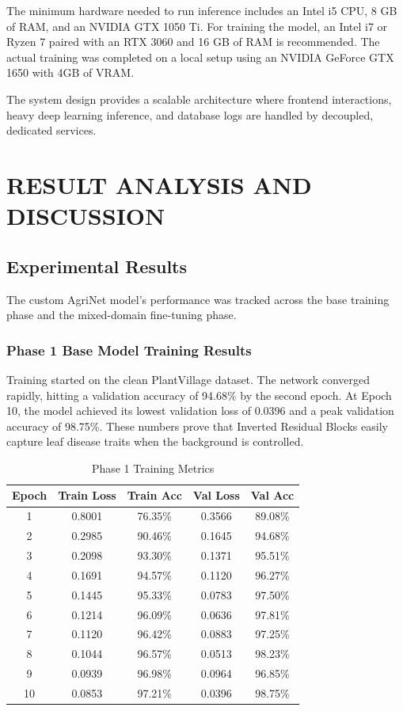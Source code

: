 \documentclass[12pt, a4paper]{report}
\begin{document}
The minimum hardware needed to run inference includes an Intel i5 CPU, 8 GB of RAM, and an NVIDIA GTX 1050 Ti. For training the model, an Intel i7 or Ryzen 7 paired with an RTX 3060 and 16 GB of RAM is recommended. The actual training was completed on a local setup using an NVIDIA GeForce GTX 1650 with 4GB of VRAM.

The system design provides a scalable architecture where frontend interactions, heavy deep learning inference, and database logs are handled by decoupled, dedicated services.

\chapter{RESULT ANALYSIS AND DISCUSSION}

\section{Experimental Results}
The custom AgriNet model's performance was tracked across the base training phase and the mixed-domain fine-tuning phase.

\subsection{Phase 1 Base Model Training Results}
Training started on the clean PlantVillage dataset. The network converged rapidly, hitting a validation accuracy of 94.68\% by the second epoch. At Epoch 10, the model achieved its lowest validation loss of 0.0396 and a peak validation accuracy of 98.75\%. These numbers prove that Inverted Residual Blocks easily capture leaf disease traits when the background is controlled.

\begin{table}[h!]
\centering
\caption{Phase 1 Training Metrics}
\vspace{0.3cm}
\begin{tabular}{@{}ccccc@{}}
\toprule
\textbf{Epoch} & \textbf{Train Loss} & \textbf{Train Acc} & \textbf{Val Loss} & \textbf{Val Acc} \\
\midrule
1 & 0.8001 & 76.35\% & 0.3566 & 89.08\% \\
2 & 0.2985 & 90.46\% & 0.1645 & 94.68\% \\
3 & 0.2098 & 93.30\% & 0.1371 & 95.51\% \\
4 & 0.1691 & 94.57\% & 0.1120 & 96.27\% \\
5 & 0.1445 & 95.33\% & 0.0783 & 97.50\% \\
6 & 0.1214 & 96.09\% & 0.0636 & 97.81\% \\
7 & 0.1120 & 96.42\% & 0.0883 & 97.25\% \\
8 & 0.1044 & 96.57\% & 0.0513 & 98.23\% \\
9 & 0.0939 & 96.98\% & 0.0964 & 96.85\% \\
10 & 0.0853 & 97.21\% & 0.0396 & 98.75\% \\
\bottomrule
\end{tabular}
\end{table}
\end{document}
